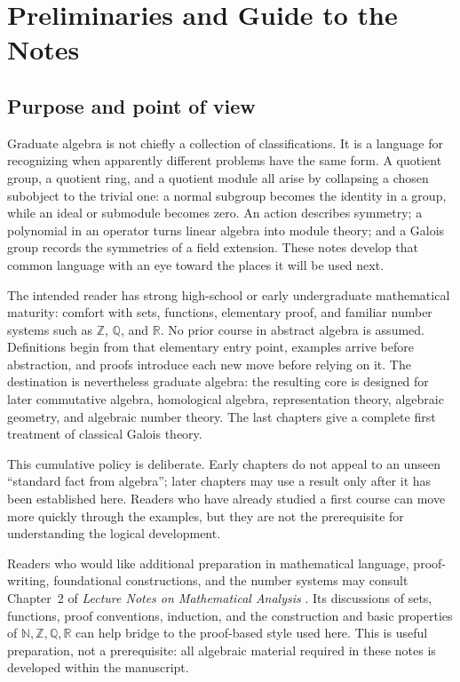 \chapter{Preliminaries and Guide to the Notes}\label{chap:preliminaries}

\section{Purpose and point of view}

Graduate algebra is not chiefly a collection of classifications.  It is a
language for recognizing when apparently different problems have the same
form. A quotient group, a quotient ring, and a quotient module all arise by
collapsing a chosen subobject to the trivial one: a normal subgroup becomes
the identity in a group, while an ideal or submodule becomes zero. An action describes symmetry; a
polynomial in an operator turns linear algebra into module theory; and a
Galois group records the symmetries of a field extension.  These notes develop
that common language with an eye toward the places it will be used next.

The intended reader has strong high-school or early undergraduate mathematical
maturity: comfort with sets, functions, elementary proof, and familiar number
systems such as \(\mathbb Z\), \(\mathbb Q\), and \(\mathbb R\).  No prior
course in abstract algebra is assumed.  Definitions begin from that elementary
entry point, examples arrive before abstraction, and proofs introduce each new
move before relying on it.  The destination is nevertheless graduate algebra:
the resulting core is designed for later commutative algebra, homological
algebra, representation theory, algebraic geometry, and algebraic number
theory.  The last chapters give a complete first treatment of classical Galois
theory.

This cumulative policy is deliberate.  Early chapters do not appeal to an
unseen ``standard fact from algebra''; later chapters may use a result only
after it has been established here.  Readers who have already studied a first
course can move more quickly through the examples, but they are not the
prerequisite for understanding the logical development.

Readers who would like additional preparation in mathematical language,
proof-writing, foundational constructions, and the number systems may consult
Chapter~2 of \emph{Lecture Notes on Mathematical Analysis} \cite{MA}.
Its discussions of sets, functions, proof conventions, induction, and the
construction and basic properties of \(\mathbb N,\mathbb Z,\mathbb Q,\mathbb R\)
can help bridge to the proof-based style used here.  This is useful
preparation, not a prerequisite: all algebraic material required in these
notes is developed within the manuscript.

